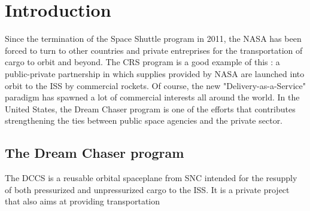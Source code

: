 \chapter{Introduction}\label{cha:intro}
Since the termination of the Space Shuttle program in 2011, the \gls{NASA} has been forced to turn to other countries and private entreprises for the transportation of cargo to orbit and beyond. The \gls{CRS} program is a good example of this : a public-private partnership in which supplies provided by NASA are launched into orbit to the \gls{ISS} by commercial rockets. Of course, the new "Delivery-as-a-Service" paradigm has spawned a lot of commercial interests all around the world. In the United States, the Dream Chaser program is one of the efforts that contributes strengthening the ties between public space agencies and the private sector.

\section{The Dream Chaser program}
The \gls{DCCS} is a reusable orbital spaceplane from \gls{SNC} intended for the resupply of both pressurized and unpressurized cargo to the \gls{ISS}. It is a private project that also aims at providing transportation 